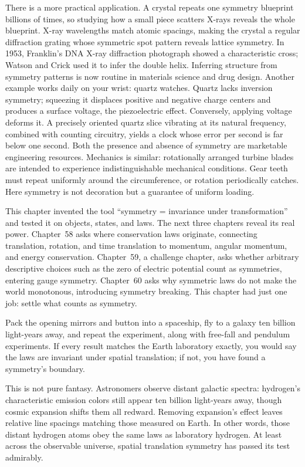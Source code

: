 There is a more practical application. A crystal repeats one symmetry blueprint billions of times, so studying how a small piece scatters X-rays reveals the whole blueprint. X-ray wavelengths match atomic spacings, making the crystal a regular diffraction grating whose symmetric spot pattern reveals lattice symmetry. In 1953, Franklin's DNA X-ray diffraction photograph showed a characteristic cross; Watson and Crick used it to infer the double helix. Inferring structure from symmetry patterns is now routine in materials science and drug design. Another example works daily on your wrist: quartz watches. Quartz lacks inversion symmetry; squeezing it displaces positive and negative charge centers and produces a surface voltage, the piezoelectric effect. Conversely, applying voltage deforms it. A precisely oriented quartz slice vibrating at its natural frequency, combined with counting circuitry, yields a clock whose error per second is far below one second. Both the presence and absence of symmetry are marketable engineering resources. Mechanics is similar: rotationally arranged turbine blades are intended to experience indistinguishable mechanical conditions. Gear teeth must repeat uniformly around the circumference, or rotation periodically catches. Here symmetry is not decoration but a guarantee of uniform loading.


This chapter invented the tool ``symmetry = invariance under transformation'' and tested it on objects, states, and laws. The next three chapters reveal its real power. Chapter~58 asks where conservation laws originate, connecting translation, rotation, and time translation to momentum, angular momentum, and energy conservation. Chapter~59, a challenge chapter, asks whether arbitrary descriptive choices such as the zero of electric potential count as symmetries, entering gauge symmetry. Chapter~60 asks why symmetric laws do not make the world monotonous, introducing symmetry breaking. This chapter had just one job: settle what counts as symmetry.

\begin{thought}
Pack the opening mirrors and button into a spaceship, fly to a galaxy ten billion light-years away, and repeat the experiment, along with free-fall and pendulum experiments. If every result matches the Earth laboratory exactly, you would say the laws are invariant under spatial translation; if not, you have found a symmetry's boundary.

This is not pure fantasy. Astronomers observe distant galactic spectra: hydrogen's characteristic emission colors still appear ten billion light-years away, though cosmic expansion shifts them all redward. Removing expansion's effect leaves relative line spacings matching those measured on Earth. In other words, those distant hydrogen atoms obey the same laws as laboratory hydrogen. At least across the observable universe, spatial translation symmetry has passed its test admirably.
\end{thought}

